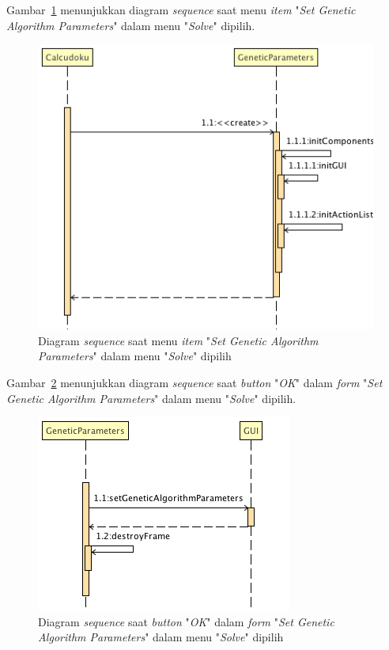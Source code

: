 \clearpage

Gambar~\ref{fig:sequencegaparameters} menunjukkan diagram \textit{sequence} saat menu \textit{item} "\textit{Set Genetic Algorithm Parameters}" dalam menu "\textit{Solve}" dipilih.

\begin{figure}
\centering
\captionsetup{justification=centering}
\includegraphics[scale=0.5]{Gambar/Analisis/SequenceDiagramGeneticParameters.png}
\caption[Diagram \textit{sequence} saat menu \textit{item}" \textit{Set Genetic Algorithm Parameters}" dalam menu "\textit{Solve}" dipilih]{Diagram \textit{sequence} saat menu \textit{item} "\textit{Set Genetic Algorithm Parameters}" dalam menu "\textit{Solve}" dipilih}
\label{fig:sequencegaparameters}
\end{figure}

Gambar~\ref{fig:sequencegaparametersok} menunjukkan diagram \textit{sequence} saat \textit{button} "\textit{OK}" dalam \textit{form} "\textit{Set Genetic Algorithm Parameters}" dalam menu "\textit{Solve}" dipilih.

\begin{figure}
\centering
\captionsetup{justification=centering}
\includegraphics[scale=0.5]{Gambar/Analisis/SequenceDiagramGeneticParametersOK.png}
\caption[Diagram \textit{sequence} saat \textit{button} "\textit{OK}" dalam \textit{form} "\textit{Set Genetic Algorithm Parameters}" dalam menu "\textit{Solve}" dipilih]{Diagram \textit{sequence} saat \textit{button} "\textit{OK}" dalam \textit{form} "\textit{Set Genetic Algorithm Parameters}" dalam menu "\textit{Solve}" dipilih}
\label{fig:sequencegaparametersok}
\end{figure}

